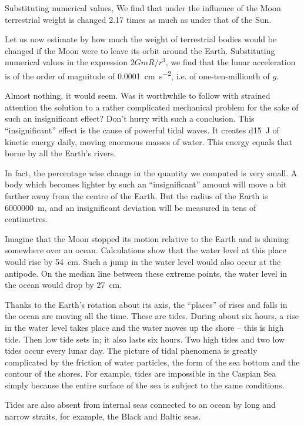 Substituting numerical values, We find that under the
influence of the Moon terrestrial weight is changed 2.17
times as much as under that of the Sun.

Let us now estimate by how much the weight of terrestrial bodies would be changed if the Moon were to leave
its orbit around the Earth. Substituting numerical
values in the expression $2GmR/r^{3}$, we find that the lunar
acceleration is of the order of magnitude of \SI{0.0001}{\centi\meter\per\second\squared},
i.e. of one-ten-millionth of $g$.

Almost nothing, it would seem. Was it worthwhile
to follow with strained attention the solution to a rather
complicated mechanical problem for the sake of such
an insignificant effect? Don't hurry with such a conclusion. This ``insignificant'' effect is the cause of powerful tidal waves. It creates \SI{d15}{\joule} of kinetic energy daily, moving enormous masses of water. This energy equals that borne by all the Earth's rivers.

In fact, the percentage wise change in the quantity we computed is very small. A body which becomes lighter by such an ``insignificant'' amount will move a bit farther away from the centre of the Earth. But the radius of the Earth is \SI{6000000}{\meter}, and an insignificant deviation will be measured in tens of centimetres.

Imagine that the Moon stopped its motion relative
to the Earth and is shining somewhere over an ocean.
Calculations show that the water level at this place
would rise by  \SI{54}{\centi\meter}. Such a jump in the water level
would also occur at the antipode. On the median line
between these extreme points, the water level in the
ocean would drop by \SI{27}{\centi\meter}.

Thanks to the Earth's rotation about its axis, the
``places'' of rises and falls in the ocean are moving all the
time. These are tides. During about six hours, a rise
in the water level takes place and the water moves up
the shore -- this is high tide. Then low tide sets in; it
also lasts six hours. Two high tides and two low tides
occur every lunar day. The picture of tidal phenomena
is greatly complicated by the friction of water particles,
the form of the sea bottom and the contour of the shores.
For example, tides are impossible in the Caspian Sea
simply because the entire surface of the sea is subject
to the same conditions.

Tides are also absent from internal seas connected to
an ocean by long and narrow straits, for example, the
Black and Baltic seas.


